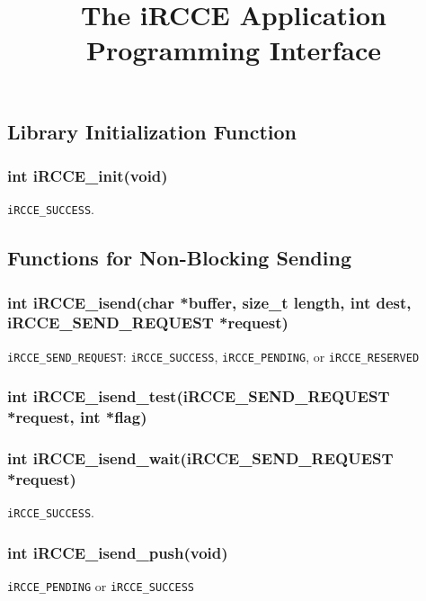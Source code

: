\documentclass[fontsize=10pt, paper=a4, DIV12, pagesize=auto]{scrartcl}
\begin{document}
\title{The iRCCE Application Programming Interface}

\maketitle

\setcounter{secnumdepth}{2}%

\subsection{Library Initialization Function}

\subsubsection{int iRCCE\_init(void)}\vspace{-0.3cm}
 \texttt{iRCCE\_SUCCESS}.

\subsection{Functions for Non-Blocking Sending}
\subsubsection{int iRCCE\_isend(char *buffer, size\_t length, int dest, iRCCE\_SEND\_REQUEST *request)}\vspace{-0.3cm}
\texttt{iRCCE\_SEND\_REQUEST}: \texttt{iRCCE\_SUCCESS}, \texttt{iRCCE\_PENDING}, or \texttt{iRCCE\_RESERVED}
\subsubsection{int iRCCE\_isend\_test(iRCCE\_SEND\_REQUEST *request, int *flag)}\vspace{-0.3cm}
\subsubsection{int iRCCE\_isend\_wait(iRCCE\_SEND\_REQUEST *request)}\vspace{-0.3cm}
\texttt{iRCCE\_SUCCESS}.
\subsubsection{int iRCCE\_isend\_push(void)}\vspace{-0.3cm}
\texttt{iRCCE\_PENDING} or \texttt{iRCCE\_SUCCESS}
\end{document}
